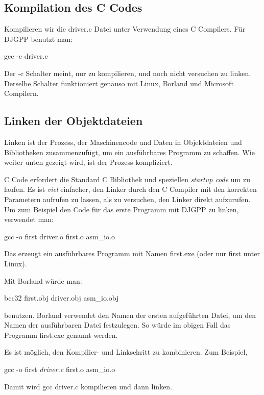 {\subsection{Kompilation des C Codes}

Kompilieren wir die {\code driver.c} Datei unter Verwendung eines C
Compilers. F\"{u}r DJGPP  benutzt man:
\begin{CodeQuote}
 gcc -c driver.c
\end{CodeQuote}
Der {\code -c} Schalter meint, nur zu kompilieren, und noch nicht
versuchen zu linken. Derselbe Schalter funktioniert genauso mit
Linux, Borland und Microsoft Compilern.

\subsection{Linken der Objektdateien \label{sec:linking} }

Linken ist der Prozess, der Maschinencode und Daten in
Objektdateien und Bibliotheken zusammenzuf\"{u}gt, um ein ausf\"{u}hrbares
Programm zu schaffen. Wie weiter unten gezeigt wird, ist der Prozess
kompliziert.

C Code erfordert die Standard C Bibliothek und speziellen
\emph{startup code}  um zu laufen. Es ist
\emph{viel} einfacher, den Linker durch den C Compiler mit den korrekten
Parametern aufrufen zu lassen, als zu versuchen, den Linker direkt
aufzurufen. Um zum Beispiel den Code f\"{u}r das erste Programm mit
DJGPP  zu linken, verwendet man:
\begin{CodeQuote}
 gcc -o first driver.o first.o asm\_io.o
\end{CodeQuote}
Das erzeugt ein ausf\"{u}hrbares Programm mit Namen {\code first.exe}
(oder nur {\code first} unter Linux).

Mit Borland  w\"{u}rde man:
\begin{CodeQuote}
 bcc32 first.obj driver.obj asm\_io.obj
\end{CodeQuote}
benutzen. Borland verwendet den Namen der ersten aufgef\"{u}hrten Datei,
um den Namen der ausf\"{u}hrbaren Datei festzulegen. So w\"{u}rde im obigen
Fall das Programm {\code first.exe} genannt werden.

Es ist m\"{o}glich, den Kompilier- und Linkschritt zu kombinieren. Zum
Beispiel,
\begin{CodeQuote}
 gcc -o first {\em driver.c} first.o asm\_io.o
\end{CodeQuote}
Damit wird {\code gcc} {\code driver.c} kompilieren und dann linken.

}

